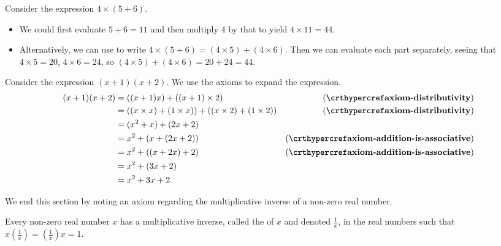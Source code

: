 \begin{example}
    Consider the expression $4\times(5+6)$.
    \begin{itemize}
        \item We could first evaluate $5+6=11$ and then multiply 4 by that to yield $4\times11=44$.
        \item Alternatively, we can use  to write $4\times(5+6) = (4\times5)+(4\times6)$. Then we can evaluate each part separately, seeing that $4\times5 = 20$, $4\times6 = 24$, so $(4\times5)+(4\times6) = 20+24=44$.
    \end{itemize}
\end{example}
\begin{example}
    Consider the expression $(x+1)(x+2)$. We use the axioms to expand the expression.
    \begin{align*}
        (x+1)(x+2) &= ((x+1)x) + ((x+1)\times2) & (\myref{axiom-distributivity})\\
        &= ((x\times x) + (1\times x)) + ((x\times2) + (1\times2)) & (\myref{axiom-distributivity})\\
        &= (x^2+x) + (2x+2)\\
        &= x^2+(x + (2x+2)) & (\myref{axiom-addition-is-associative})\\
        &= x^2+((x + 2x)+2) & (\myref{axiom-addition-is-associative})\\
        &= x^2 + (3x+2)\\
        &= x^2 + 3x + 2.
    \end{align*}
\end{example}

We end this section by noting an axiom regarding the multiplicative inverse of a non-zero real number.
\begin{axiom}\label{axiom-reciprocal}
    Every non-zero real number $x$ has a multiplicative inverse, called the  of $x$ and denoted $\frac1x$, in the real numbers such that $x\left(\frac1x\right) = \left(\frac1x\right)x = 1$.
\end{axiom}

